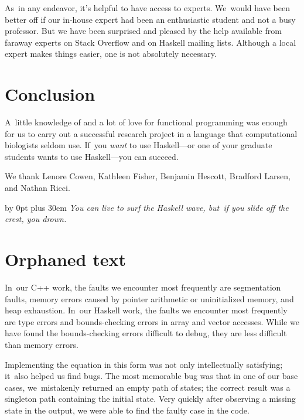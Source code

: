 \documentclass[preprint,nonatbib,blockstyle,nocopyrightspace,times]{sigplanconf}
\begin{document}
As~in any endeavor, it's helpful to have access to experts.
We~would have been better off if our in-house expert had been an
enthusiastic student and not a busy professor.
But we have been surprised and pleased by the help available from
faraway experts on Stack Overflow and on Haskell mailing lists.
Although a local expert makes things easier, one is not
 absolutely necessary.


\section{Conclusion}

A~little knowledge of and a lot of love for functional programming was
enough for us to carry out a successful research project in a language
that computational biologists seldom use.
If~you \emph{want} to use Haskell---or one of your graduate students
wants to use Haskell---you can
succeed. 




%  

 

\ifnotcutting
\acks

We thank Lenore Cowen, Kathleen Fisher, Benjamin Hescott, Bradford
Larsen, and Nathan Ricci. 
\fi









\vfill

\begingroup
\parfillskip=0pt
\advance\leftskip by 0pt plus 30em
\emph{You can live to surf the Haskell wave, but~if you slide off the crest, you
drown.}
\par
\endgroup


\break


\appendix


\section{Orphaned text}


In~our C++ work, the faults we encounter most frequently are
segmentation faults, 
memory errors caused by pointer arithmetic or uninitialized 
memory,
and heap exhaustion.
In~our Haskell work, the faults we encounter most frequently are
type errors and bounds-checking errors in array and vector accesses.
While we have found the bounds-checking errors difficult to debug,
they are less difficult than memory errors.


Implementing the equation in this form was not only intellectually
satisfying; it~also helped us find
bugs.
The most memorable bug was that in one of our base cases, 
we~mistakenly returned an empty path of states;
the correct result was a singleton path containing the initial state.
Very quickly after observing a missing state in the output, we were
able to find the faulty case in the code.
\end{document}
